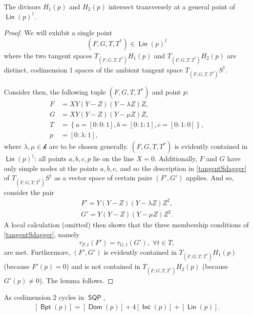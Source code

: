 \documentclass{article}
\renewcommand{\k}{\mathscr{k}}
\DeclareMathOperator{\SQP}{\mathsf{SQP}}
\DeclareMathOperator{\BP}{\mathsf{Bpt}}
\DeclareMathOperator{\Dom}{\mathsf{Dom}}
\DeclareMathOperator{\Lin}{\mathsf{Lin}}
\DeclareMathOperator{\Inc}{\mathsf{Inc}}
\begin{document}
\begin{lemma}
    \label{LinTransverse} The divisors $H_{1}(p)$ and $H_{2}(p)$ intersect transversely at a general point of $\Lin(p)^{\dagger}.$
\end{lemma}

\begin{proof}
    We will  exhibit a single point $$(F,G,T,T^{*}) \in \Lin(p)^{\dagger}$$ where the two tangent spaces $T_{(F,G,T,T^{*})}H_{1}(p)$ and $T_{(F,G,T,T^{*})}H_{2}(p)$ are distinct, codimension 1 spaces of the ambient tangent space $T_{(F,G,T,T^{*})}S^{\dagger}$.

    Consider then, the following tuple $(F,G,T,T^{*})$ and point $p$: 
    \begin{align*}
        F & = XY(Y-Z)(Y-\lambda Z)Z, \\
        G & = XY(Y-Z)(Y-\mu Z)Z ,\\
        T & = \left\{a = [0:0:1], b = [0:1:1], c = [0:1:0] \right\},\\
        p & = [0:\lambda:1],
    \end{align*}
    where $\lambda, \mu \in \k$ are to be chosen generally. $(F,G,T,T^{*})$ is evidently contained in $\Lin(p)^\dagger$: all points $a,b,c,p$ lie on the line $X=0$. Additionally, $F$ and $G$ have only simple nodes at the points $a,b,c$, and so the description in \eqref{tangentSdagger} of $T_{(F,G,T,T^{*})}S^{\dagger}$ as a vector space of certain pairs $(F',G')$ applies.   And so, consider the pair 
    \begin{align*}
        F' = Y(Y-Z)(Y-\lambda Z)Z^2,\\
        G' = Y(Y-Z)(Y-\mu Z)Z^{2}.
    \end{align*}
    A local calculation (omitted) then shows that the three membership conditions of \eqref{tangentSdagger}, namely $$\tau_{F,t}(F') = \tau_{G,t}(G'), \,\, \forall t \in T,$$ are met. Furthermore, $(F',G')$ is evidently contained in $T_{(F,G,T,T^{*})}H_{1}(p)$ (because $F'(p)=0$) and is not contained in $T_{(F,G,T,T^{*})}H_{2}(p)$ (because $G'(p) \neq 0$). The lemma follows.  
\end{proof}


    
\begin{theorem}
  \label{theorem:BPdecomposition}
  As codimension $2$ cycles in $\SQP$, 
  \begin{eqnarray}
      \left[\BP(p) \right] = \left[\Dom(p) \right] + 4\left[\Inc(p)
    \right] + \left[\Lin(p) \right].
  \end{eqnarray}
\end{theorem}
\end{document}
